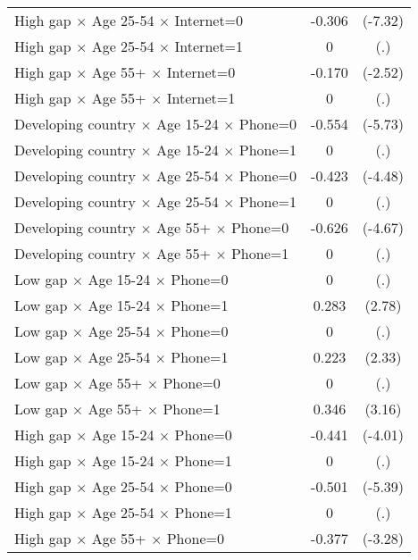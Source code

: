 {\begin{longtable}{l*{1}{cc}}
High gap $\times$ Age 25-54 $\times$ Internet=0&      -0.306\sym{***}&     (-7.32)\\
High gap $\times$ Age 25-54 $\times$ Internet=1&           0         &         (.)\\
High gap $\times$ Age 55+ $\times$ Internet=0&      -0.170\sym{*}  &     (-2.52)\\
High gap $\times$ Age 55+ $\times$ Internet=1&           0         &         (.)\\
Developing country $\times$ Age 15-24 $\times$ Phone=0&      -0.554\sym{***}&     (-5.73)\\
Developing country $\times$ Age 15-24 $\times$ Phone=1&           0         &         (.)\\
Developing country $\times$ Age 25-54 $\times$ Phone=0&      -0.423\sym{***}&     (-4.48)\\
Developing country $\times$ Age 25-54 $\times$ Phone=1&           0         &         (.)\\
Developing country $\times$ Age 55+ $\times$ Phone=0&      -0.626\sym{***}&     (-4.67)\\
Developing country $\times$ Age 55+ $\times$ Phone=1&           0         &         (.)\\
Low gap $\times$ Age 15-24 $\times$ Phone=0&           0         &         (.)\\
Low gap $\times$ Age 15-24 $\times$ Phone=1&       0.283\sym{**} &      (2.78)\\
Low gap $\times$ Age 25-54 $\times$ Phone=0&           0         &         (.)\\
Low gap $\times$ Age 25-54 $\times$ Phone=1&       0.223\sym{*}  &      (2.33)\\
Low gap $\times$ Age 55+ $\times$ Phone=0&           0         &         (.)\\
Low gap $\times$ Age 55+ $\times$ Phone=1&       0.346\sym{**} &      (3.16)\\
High gap $\times$ Age 15-24 $\times$ Phone=0&      -0.441\sym{***}&     (-4.01)\\
High gap $\times$ Age 15-24 $\times$ Phone=1&           0         &         (.)\\
High gap $\times$ Age 25-54 $\times$ Phone=0&      -0.501\sym{***}&     (-5.39)\\
High gap $\times$ Age 25-54 $\times$ Phone=1&           0         &         (.)\\
High gap $\times$ Age 55+ $\times$ Phone=0&      -0.377\sym{**} &     (-3.28)\\

\end{longtable}}
